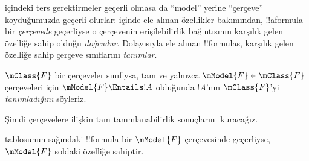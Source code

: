 



 içindeki ters gerektirmeler geçerli olmasa da
``model'' yerine ``çerçeve'' koyduğumuzda geçerli olurlar:
 içinde ele alınan özellikler bakımından,
!!a{formula} bir \emph{çerçevede} geçerliyse o çerçevenin erişilebilirlik
bağıntısının karşılık gelen özelliğe sahip olduğu \emph{doğrudur}. Dolayısıyla ele
alınan !!{formula}s, karşılık gelen özelliğe sahip çerçeve sınıflarını
\emph{tanımlar}.

\begin{defn}
  $\mClass{F}$ bir çerçeveler sınıfıysa, tam ve yalnızca
  $\mModel{F}\in\mClass{F}$ çerçeveleri için $\mModel{F}\Entails !A$
  olduğunda $!A$'nın $\mClass{F}$'yi \emph{tanımladığını} söyleriz.
\end{defn}

Şimdi çerçevelere ilişkin tam tanımlanabilirlik sonuçlarını kuracağız.

\begin{thm}
 tablosunun sağındaki !!{formula} bir
$\mModel{F}$ çerçevesinde geçerliyse, $\mModel{F}$ soldaki özelliğe
sahiptir.
\end{thm}

